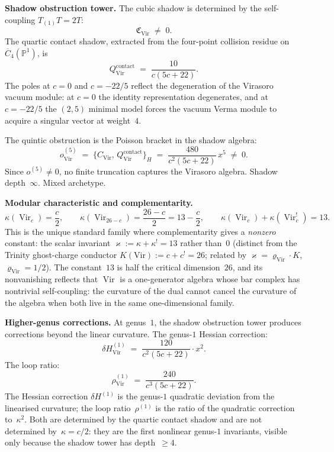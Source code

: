 \documentclass[11pt]{report}
\theoremstyle{definition}
\theoremstyle{remark}
\providecommand{\Vir}{\mathrm{Vir}}
\numberwithin{equation}{section}
\begin{document}
\medskip
\noindent\textbf{Shadow obstruction tower.}
The cubic shadow is determined by the self-coupling $T_{(1)}T=2T$:
\[
\mathfrak{C}_{\mathrm{Vir}} \;\neq\; 0.
\]
The quartic contact shadow, extracted from the four-point collision
residue on $\overline{C}_4(\mathbb P^1)$, is
\[
Q^{\mathrm{contact}}_{\mathrm{Vir}}
\;=\;
\frac{10}{c(5c+22)}.
\]
The poles at $c=0$ and $c=-22/5$ reflect the degeneration of the
Virasoro vacuum module: at $c=0$ the identity representation
degenerates, and at $c=-22/5$ the $(2,5)$ minimal model forces the
vacuum Verma module to acquire a singular vector at weight~$4$.

The quintic obstruction is the Poisson bracket in the shadow algebra:
\[
o^{(5)}_{\mathrm{Vir}}
\;=\;
\bigl\{C_{\mathrm{Vir}},\,
Q^{\mathrm{contact}}_{\mathrm{Vir}}\bigr\}_H
\;=\;
\frac{480}{c^2(5c+22)}\,x^5
\;\neq\; 0.
\]
Since $o^{(5)}\neq 0$, no finite truncation captures the
Virasoro algebra. Shadow depth~$\infty$. Mixed archetype.

\medskip
\noindent\textbf{Modular characteristic and complementarity.}
\[
\kappa(\operatorname{Vir}_c) = \frac{c}{2},
\qquad
\kappa(\operatorname{Vir}_{26-c}) = \frac{26-c}{2} = 13 - \frac{c}{2},
\qquad
\kappa(\operatorname{Vir}_c)+\kappa(\operatorname{Vir}_c^!)
= 13.
\]
This is the unique standard family where complementarity gives a
\emph{nonzero} constant: the scalar invariant
$\varkappa := \kappa+\kappa^!=13$ rather than~$0$ (distinct from the
Trinity ghost-charge conductor $K(\Vir) := c + c^! = 26$; related by
$\varkappa = \varrho_{\Vir}\cdot K$, $\varrho_{\Vir} = 1/2$). The
constant~$13$ is half the critical dimension~$26$, and its
nonvanishing reflects that $\operatorname{Vir}$ is a
one-generator algebra whose bar complex has nontrivial
self-coupling: the curvature of the dual cannot cancel the curvature
of the algebra when both live in the same one-dimensional family.

\medskip
\noindent\textbf{Higher-genus corrections.}
At genus~$1$, the shadow obstruction tower produces corrections beyond the
linear curvature. The genus-$1$ Hessian correction:
\[
\delta H^{(1)}_{\mathrm{Vir}}
\;=\;
\frac{120}{c^2(5c+22)}\cdot x^2.
\]
The loop ratio:
\[
\rho^{(1)}_{\mathrm{Vir}}
\;=\;
\frac{240}{c^3(5c+22)}.
\]
The Hessian correction $\delta H^{(1)}$ is the genus-$1$ quadratic
deviation from the linearised curvature; the loop
ratio~$\rho^{(1)}$ is the ratio of the quadratic correction
to~$\kappa^2$. Both are determined by the quartic contact shadow
and are not determined by~$\kappa=c/2$: they are the
first nonlinear genus-$1$ invariants, visible only because the shadow
tower has depth~$\ge 4$.
\end{document}

